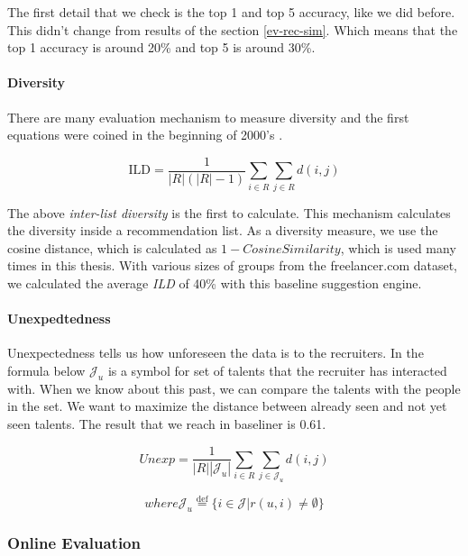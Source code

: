 The first detail that we check is the top 1 and top 5 accuracy, like we did before. This didn't change from results of the section \ref{ev-rec-sim}. Which means that the top 1 accuracy is around 20\% and top 5 is around 30\%.

\paragraph{Diversity}\label{ev-unsupervised-group-diversity}

There are many evaluation mechanism to measure diversity and the first equations were coined in the beginning of 2000's \cite{smyth2001similarity}.

$$\mathrm { ILD } = \frac { 1 } { | R | ( | R | - 1 ) } \sum _ { i \in R } \sum _ { j \in R } d ( i , j )$$

The above \textit{inter-list diversity} is the first to calculate. This mechanism calculates the diversity inside a recommendation list. As a diversity measure, we use the cosine distance, which is calculated as $1 - Cosine Similarity$, which is used many times in this thesis. With various sizes of groups from the freelancer.com dataset, we calculated the average \textit{ILD} of 40\% with this baseline suggestion engine.

\paragraph{Unexpedtedness}\label{ev-unsupervised-group-unexpectedness}

Unexpectedness tells us how unforeseen the data is to the recruiters.  In the formula below $\mathcal { J } _ { u }$ is a symbol for set of talents that the recruiter has interacted with. When we know about this past, we can compare the talents with the people in the set. We want to maximize the distance between already seen and not yet seen talents. The result that we reach in baseliner is 0.61.

$$
Unexp = \frac { 1 } { | R | \left| \mathcal { J } _ { u } \right| } \sum _ { i \in R } \sum _ { j \in \mathcal { J } _ { u } } d ( i , j )
$$

$$
where 
\mathcal { J } _ { u } \stackrel { \mathrm { def } } { = } \{ i \in \mathcal { J } | r ( u , i ) \neq \emptyset \}
$$


\subsubsection{Online Evaluation}

